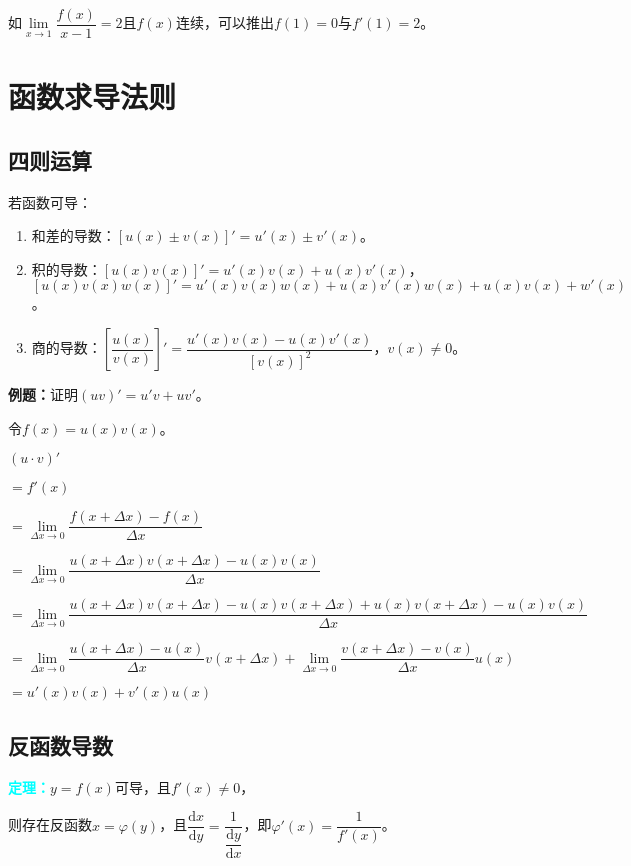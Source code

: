 \documentclass[UTF8, 12pt]{ctexart}
\begin{document}
如$\lim\limits_{x\to 1}\dfrac{f(x)}{x-1}=2$且$f(x)$连续，可以推出$f(1)=0$与$f'(1)=2$。


\section{函数求导法则}

\subsection{四则运算}

若函数可导：

\begin{enumerate}
    \item 和差的导数：$[u(x)\pm v(x)]'=u'(x)\pm v'(x)$。
    \item 积的导数：$[u(x)v(x)]'=u'(x)v(x)+u(x)v'(x)$，\\ $[u(x)v(x)w(x)]'=u'(x)v(x)w(x)+u(x)v'(x)w(x)+u(x)v(x)+w'(x)$。
    \item 商的导数：$\left[\dfrac{u(x)}{v(x)}\right]'=\dfrac{u'(x)v(x)-u(x)v'(x)}{[v(x)]^2}$，$v(x)\neq 0$。
\end{enumerate}

\textbf{例题：}证明$(uv)'=u'v+uv'$。

令$f(x)=u(x)v(x)$。

$(u\cdot v)'$

$=f'(x)$

$=\lim\limits_{\Delta x\to 0}\dfrac{f(x+\Delta x)-f(x)}{\Delta x}$

$=\lim\limits_{\Delta x\to 0}\dfrac{u(x+\Delta x)v(x+\Delta x)-u(x)v(x)}{\Delta x}$

$=\lim\limits_{\Delta x\to 0}\dfrac{u(x+\Delta x)v(x+\Delta x)-u(x)v(x+\Delta x)+u(x)v(x+\Delta x)-u(x)v(x)}{\Delta x}$

$=\lim\limits_{\Delta x\to 0}\dfrac{u(x+\Delta x)-u(x)}{\Delta x}v(x+\Delta x) +\lim\limits_{\Delta x\to 0}\dfrac{v(x+\Delta x)-v(x)}{\Delta x}u(x)$

$=u'(x)v(x)+v'(x)u(x)$

\subsection{反函数导数}

\textcolor{aqua}{\textbf{定理：}}$y=f(x)$可导，且$f'(x)\neq 0$，

则存在反函数$x=\varphi(y)$，且$\dfrac{\textrm{d}x}{\textrm{d}y}=\dfrac{1}{\dfrac{\textrm{d}y}{\textrm{d}x}}$，即$\varphi'(x)=\dfrac{1}{f'(x)}$。\medskip
\end{document}
